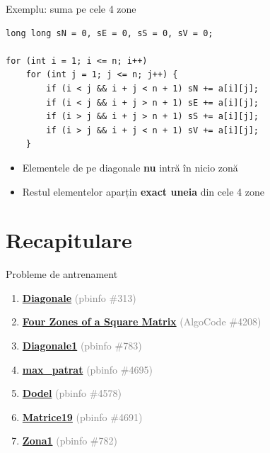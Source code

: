 \documentclass{beamer}
\begin{document}
\begin{frame}[fragile]{Exemplu: suma pe cele 4 zone}
  \begin{lstlisting}
long long sN = 0, sE = 0, sS = 0, sV = 0;

for (int i = 1; i <= n; i++)
    for (int j = 1; j <= n; j++) {
        if (i < j && i + j < n + 1) sN += a[i][j];
        if (i < j && i + j > n + 1) sE += a[i][j];
        if (i > j && i + j > n + 1) sS += a[i][j];
        if (i > j && i + j < n + 1) sV += a[i][j];
    }
  \end{lstlisting}

  \begin{itemize}
    \item Elementele de pe diagonale \textbf{nu} intră în nicio zonă
    \item Restul elementelor aparțin \textbf{exact uneia} din cele 4 zone
  \end{itemize}
\end{frame}

\section{Recapitulare}


\begin{frame}{Probleme de antrenament}
  \begin{enumerate}
    \footnotesize\itemsep0pt
    \item \href{https://www.pbinfo.ro/probleme/313/diagonale}{\textbf{Diagonale}}
          \textcolor{gray}{(pbinfo \#313)}
    \item \href{https://code.algolymp.com/problems/4208}{\textbf{Four Zones of a Square Matrix}}
          \textcolor{gray}{(AlgoCode \#4208)}
    \item \href{https://www.pbinfo.ro/probleme/783/diagonale1}{\textbf{Diagonale1}}
          \textcolor{gray}{(pbinfo \#783)}
    \item \href{https://www.pbinfo.ro/probleme/4695/max-patrat}{\textbf{max\_patrat}}
          \textcolor{gray}{(pbinfo \#4695)}
    \item \href{https://www.pbinfo.ro/probleme/4578/dodel}{\textbf{Dodel}}
          \textcolor{gray}{(pbinfo \#4578)}
    \item \href{https://www.pbinfo.ro/probleme/4691/matrice19}{\textbf{Matrice19}}
          \textcolor{gray}{(pbinfo \#4691)}
    \item \href{https://www.pbinfo.ro/probleme/782/zona1}{\textbf{Zona1}}
          \textcolor{gray}{(pbinfo \#782)}
  \end{enumerate}
\end{frame}
\end{document}
